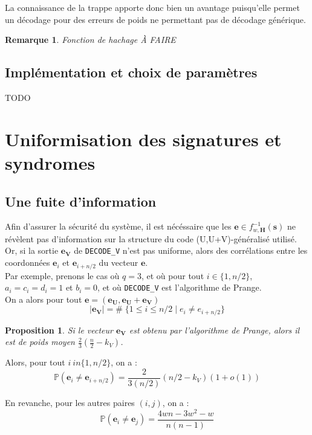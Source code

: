 \documentclass[12pt]{article}
\theoremstyle{plain}
\newtheorem{remarque}[thm]{Remarque}
\newtheorem{propo}[thm]{Proposition}
\begin{document}
\noindent La connaissance de la trappe apporte donc bien un avantage puisqu'elle permet un décodage pour des erreurs de poids ne permettant pas de décodage générique. 

\begin{remarque} Fonction de hachage
À FAIRE
\end{remarque}

\subsection{Implémentation et choix de paramètres}
TODO \\
\section{Uniformisation des signatures et syndromes}

\subsection{Une fuite d'information}
Afin d'assurer la sécurité du système, il est nécéssaire que les $\mathbf{e} \in f_{w,\mathbf{H}}^{-1}(\mathbf{s})$ ne révèlent pas d'information sur la structure du code (U,U+V)-généralisé utilisé. \\
Or, si la sortie $\mathbf{e_V}$ de \verb|DECODE_V| n'est pas uniforme, alors des corrélations entre les coordonnées $\mathbf{e}_i$ et $\mathbf{e}_{i+n/2}$ du vecteur $\mathbf{e}$. \\
Par exemple, prenons le cas où $q=3$, et où pour tout $i \in \{1,n/2\}$, $a_i = c_i = d_i = 1$ et $b_i = 0$, et où \verb|DECODE_V| est l'algorithme de Prange. \\
On a alors pour tout $\mathbf{e} = (\mathbf{e_U},\mathbf{e_U}+\mathbf{e_V})$
$$ |\mathbf{e_V}| = \# \; \{1  \leq i \leq n/2 \;|\; e_i \neq e_{i+n/2}\}$$

\begin{propo}
Si le vecteur $\mathbf{e_V}$ est obtenu par l'algorithme de Prange, alors il est de poids moyen $\frac{2}{3}(\frac{n}{2}-k_V)$.
\end{propo}



Alors, pour tout $i \ in \{1,n/2\}$, on a :
$$ \mathbb{P}(\mathbf{e}_i \neq \mathbf{e}_{i+n/2}) = \frac{2}{3(n/2)}(n/2-k_V)(1+o(1))$$

\noindent En revanche, pour les autres paires $(i,j)$, on a :
$$ \mathbb{P}(\mathbf{e}_i \neq \mathbf{e}_{j}) = \frac{4wn - 3w^2-w}{n(n-1)}$$
\end{document}

